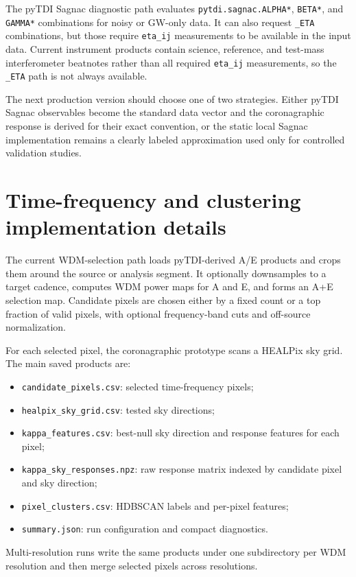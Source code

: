 \documentclass[%
 reprint,
 amsmath,amssymb,
 aps,
 prd,
]{revtex4-2}
\begin{document}
The pyTDI Sagnac diagnostic path evaluates \texttt{pytdi.sagnac.ALPHA*}, \texttt{BETA*}, and \texttt{GAMMA*} combinations for noisy or GW-only data.  It can also request \texttt{\_ETA} combinations, but those require \texttt{eta\_ij} measurements to be available in the input data.  Current instrument products contain science, reference, and test-mass interferometer beatnotes rather than all required \texttt{eta\_ij} measurements, so the \texttt{\_ETA} path is not always available.

The next production version should choose one of two strategies.  Either pyTDI Sagnac observables become the standard data vector and the coronagraphic response is derived for their exact convention, or the static local Sagnac implementation remains a clearly labeled approximation used only for controlled validation studies.

\section{Time-frequency and clustering implementation details}
\label{app:tf_clustering}

The current WDM-selection path loads pyTDI-derived A/E products and crops them around the source or analysis segment.  It optionally downsamples to a target cadence, computes WDM power maps for A and E, and forms an A+E selection map.  Candidate pixels are chosen either by a fixed count or a top fraction of valid pixels, with optional frequency-band cuts and off-source normalization.

For each selected pixel, the coronagraphic prototype scans a HEALPix sky grid.  The main saved products are:
\begin{itemize}
\item \texttt{candidate\_pixels.csv}: selected time-frequency pixels;
\item \texttt{healpix\_sky\_grid.csv}: tested sky directions;
\item \texttt{kappa\_features.csv}: best-null sky direction and response features for each pixel;
\item \texttt{kappa\_sky\_responses.npz}: raw response matrix indexed by candidate pixel and sky direction;
\item \texttt{pixel\_clusters.csv}: HDBSCAN labels and per-pixel features;
\item \texttt{summary.json}: run configuration and compact diagnostics.
\end{itemize}
Multi-resolution runs write the same products under one subdirectory per WDM resolution and then merge selected pixels across resolutions.
\end{document}
